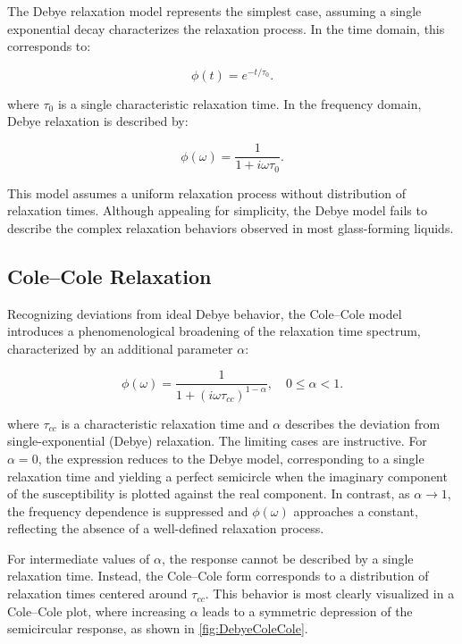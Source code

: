 The Debye relaxation model represents the simplest case, assuming a single exponential decay characterizes the relaxation process. In the time domain, this corresponds to:

\begin{equation}
	\phi(t) = e^{-t/\tau_0}.
\end{equation}

\noindent where $\tau_0$ is a single characteristic relaxation time. In the frequency domain, Debye relaxation is described by:

\begin{equation}
	\phi(\omega) = \frac{1}{1 + i\omega\tau_0}.
\end{equation}

\noindent This model assumes a uniform relaxation process without distribution of relaxation times. Although appealing for simplicity, the Debye model fails to describe the complex relaxation behaviors observed in most glass-forming liquids.

\subsection{Cole--Cole Relaxation}

Recognizing deviations from ideal Debye behavior, the Cole--Cole model introduces a phenomenological broadening of the relaxation time spectrum, characterized by an additional parameter $\alpha$:

\begin{equation}
	\phi(\omega) = \frac{1}{1+(i\omega\tau_{cc})^{1-\alpha}}, \quad 0 \le \alpha < 1.
\end{equation}

\noindent where $\tau_{cc}$ is a characteristic relaxation time and $\alpha$ describes the deviation from single-exponential (Debye) relaxation. The limiting cases are instructive. For $\alpha = 0$, the expression reduces to the Debye model, corresponding to a single relaxation time and yielding a perfect semicircle when the imaginary component of the susceptibility is plotted against the real component. In contrast, as $\alpha \rightarrow 1$, the frequency dependence is suppressed and $\phi(\omega)$ approaches a constant, reflecting the absence of a well-defined relaxation process.

For intermediate values of $\alpha$, the response cannot be described by a single relaxation time. Instead, the Cole--Cole form corresponds to a distribution of relaxation times centered around $\tau_{cc}$. This behavior is most clearly visualized in a Cole--Cole plot, where increasing $\alpha$ leads to a symmetric depression of the semicircular response, as shown in \fig\nolinebreak\ref{fig:DebyeColeCole}.

